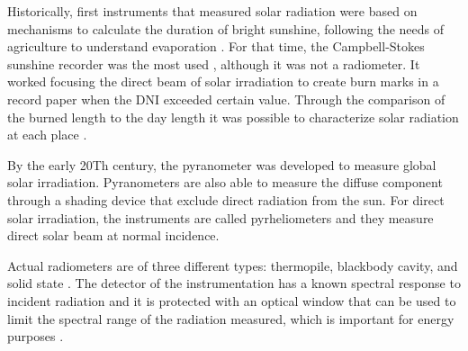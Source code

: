 Historically, first instruments that measured solar radiation were based on mechanisms to calculate the duration of bright sunshine, following the needs of agriculture to understand evaporation \cite*{sengupta2017best}. For that time, the Campbell-Stokes sunshine recorder was the most used \cite*{sengupta2017best}, although it was not a radiometer. It worked focusing the direct beam of solar irradiation to create burn marks in a record paper when the DNI exceeded certain value. Through the comparison of the burned length to the day length it was possible to characterize solar radiation at each place \cite*{Iqbal2012Introduction}.

By the early 20Th century, the pyranometer was developed to measure global solar irradiation. Pyranometers are also able to measure the diffuse component through a shading device that exclude direct radiation from the sun. For direct solar irradiation, the instruments are called pyrheliometers and they measure direct solar beam at normal incidence.
 
Actual radiometers are of three different types: thermopile, blackbody cavity, and solid state \cite*{Gueymard2008}. The detector of the instrumentation has a known spectral response to incident radiation and it is protected with an optical window that can be used to limit the spectral range of the radiation measured, which is important for energy purposes \cite*{Gueymard2008}. 


